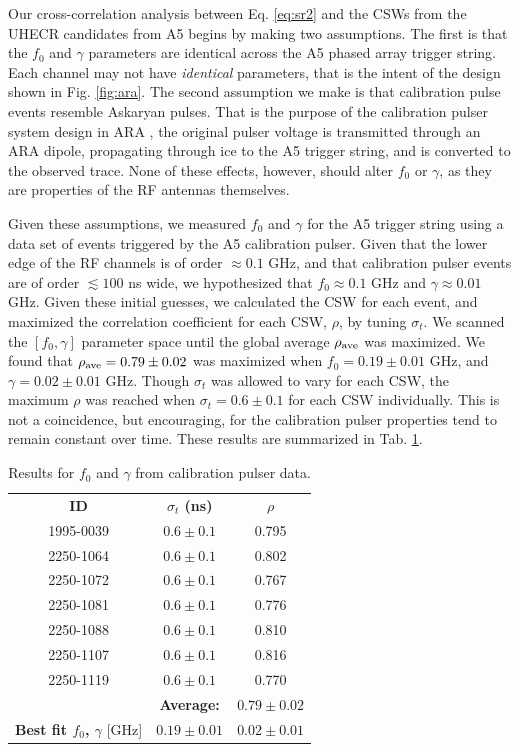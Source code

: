 \documentclass[amsmath,amssymb,aps,prd,10pt,twocolumn,showkeys]{revtex4}
\begin{document}
Our cross-correlation analysis between Eq. \ref{eq:sr2} and the CSWs from the UHECR candidates from A5 begins by making two assumptions.  The first is that the $f_0$ and $\gamma$ parameters are identical across the A5 phased array trigger string.  Each channel may not have \textit{identical} parameters, that is the intent of the design shown in Fig. \ref{fig:ara}.  The second assumption we make is that calibration pulse events resemble Askaryan pulses.  That is the purpose of the calibration pulser system design in ARA \cite{allison2012design-cd3,allison2022lowthreshold-795}, the original pulser voltage is transmitted through an ARA dipole, propagating through ice to the A5 trigger string, and is converted to the observed trace.  None of these effects, however, should alter $f_0$ or $\gamma$, as they are properties of the RF antennas themselves.

Given these assumptions, we measured $f_0$ and $\gamma$ for the A5 trigger string using a data set of events triggered by the A5 calibration pulser.  Given that the lower edge of the RF channels is of order $\approx 0.1$ GHz, and that calibration pulser events are of order $\lesssim 100$ ns wide, we hypothesized that $f_0 \approx 0.1$ GHz and $\gamma \approx 0.01$ GHz.  Given these initial guesses, we calculated the CSW for each event, and maximized the correlation coefficient for each CSW, $\rho$, by tuning $\sigma_t$.  We scanned the $[f_0,\gamma]$ parameter space until the global average $\rho_{\rm ave}$ was maximized.  We found that $\rho_{\rm ave} = 0.79\pm 0.02$ was maximized when $f_0 = 0.19\pm 0.01$ GHz, and $\gamma = 0.02\pm 0.01$ GHz.  Though $\sigma_t$ was allowed to vary for each CSW, the maximum $\rho$ was reached when $\sigma_t = 0.6\pm 0.1$ for each CSW individually.  This is not a coincidence, but encouraging, for the calibration pulser properties tend to remain constant over time.  These results are summarized in Tab. \ref{tab:cal}.

\begin{table}
\centering
\begin{tabular}{| c | c | c |}
\hline
\textbf{ID} & \textbf{$\sigma_t$ (ns)} & $\rho$ \\ 
1995-0039 & $0.6\pm 0.1$ & 0.795 \\
2250-1064 & $0.6\pm 0.1$ & 0.802 \\
2250-1072 & $0.6\pm 0.1$ & 0.767 \\
2250-1081 & $0.6\pm 0.1$ & 0.776 \\
2250-1088 & $0.6\pm 0.1$ & 0.810 \\
2250-1107 & $0.6\pm 0.1$ & 0.816 \\
2250-1119 & $0.6\pm 0.1$ & 0.770 \\ \hline
& \textbf{Average:} & $0.79\pm 0.02$ \\ \hline \hline
\textbf{Best fit $f_0$, $\gamma$} [GHz] & $0.19\pm 0.01$ & $0.02\pm 0.01$ \\
\hline
\end{tabular}
\caption{\label{tab:cal} Results for $f_0$ and $\gamma$ from calibration pulser data.}
\end{table}
\end{document}
